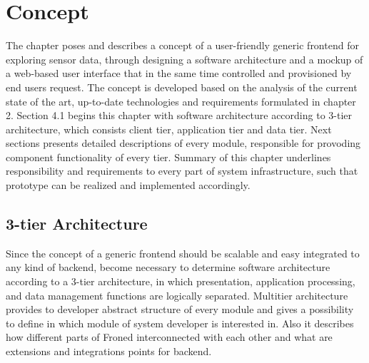 \chapter{Concept}
     The chapter poses and describes a concept of a user-friendly generic frontend for exploring sensor data, 
     through designing a software architecture and a mockup of a web-based user interface that in the same time controlled and provisioned by end users request. The concept is developed based on the analysis of the current state of the art, up-to-date technologies and requirements formulated in chapter 2. 
     \newline
     Section 4.1 begins this chapter with software architecture according to 3-tier architecture, which consists client tier, application tier and data tier. Next sections presents detailed descriptions of every module, responsible for provoding component functionality of every tier. Summary of this chapter underlines responsibility and requirements to every part of system infrastructure, such that prototype can be realized and implemented accordingly.


\section{3-tier Architecture}
  Since the concept of a generic frontend should be scalable and easy integrated to any kind of backend, become necessary to determine software architecture according to a 3-tier architecture, in which presentation, application processing, and data management functions are logically separated. Multitier architecture provides to developer abstract structure of every module and gives a possibility to define in which module of system developer is interested in. Also it describes how different parts of Froned interconnected with each other and what are extensions and integrations points for backend.

